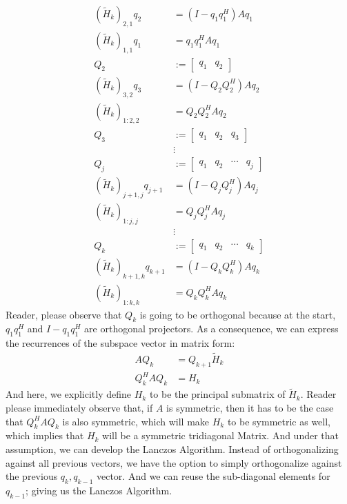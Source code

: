 \documentclass[]{article}
\theoremstyle{definition}
\begin{document}
            \begin{align}
                (\tilde{H}_k)_{2, 1}q_2 &= (I - q_1q_1^H)Aq_1
                \\
                (\tilde{H}_k)_{1, 1}q_1 &= q_1q_1^HAq_1
                \\
                Q_2 &:= \begin{bmatrix}
                    q_1 & q_2
                \end{bmatrix}
                \\
                (\tilde{H}_k)_{3, 2}q_3 &= (I - Q_2Q_2^H)Aq_2
                \\
                (\tilde{H}_k)_{1:2, 2} &= Q_2Q_2^HAq_2
                \\
                Q_3 &:= \begin{bmatrix}
                    q_1 & q_2 & q_3
                \end{bmatrix}
                \\
                & \vdots 
                \\
                Q_j &:= \begin{bmatrix}
                    q_1 & q_2 & \cdots & q_j
                \end{bmatrix}
                \\
                (\tilde{H}_k)_{j + 1, j}q_{j + 1}&= (I - Q_jQ_j^H)Aq_j
                \\
                (\tilde{H}_k)_{1:j, j} &= Q_jQ_j^HAq_j
                \\
                &\vdots 
                \\
                Q_k &:= \begin{bmatrix}
                    q_1 & q_2 & \cdots & q_k
                \end{bmatrix}
                \\
                (\tilde{H}_k)_{k + 1, k}q_{k + 1}&= (I - Q_kQ_k^H)Aq_k
                \\
                (\tilde{H}_k)_{1:k, k} &= Q_kQ_k^HAq_k
            \end{align}
            Reader, please observe that $Q_k$ is going to be orthogonal because at the start, $q_1q_1^H$ and $I - q_1q_1^H$ are orthogonal projectors. As a consequence, we can express the recurrences of the subspace vector in matrix form: 
            \begin{align}
                AQ_{k} &= Q_{k + 1}\tilde{H}_k
                \\
                Q_{k}^HAQ_{k} &= H_k
            \end{align}
            And here, we explicitly define $H_k$ to be the principal submatrix of $\tilde{H}_k$. Reader please immediately observe that, if $A$ is symmetric, then it has to be the case that $Q^H_kAQ_k$ is also symmetric, which will make $H_k$ to be symmetric as well, which implies that $H_k$ will be a symmetric tridiagonal Matrix. And under that assumption, we can develop the Lanczos Algorithm. Instead of orthogonalizing against all previous vectors, we have the option to simply orthogonalize against the previous $q_k, q_{k - 1}$ vector. And we can reuse the sub-diagonal elements for $q_{k - 1}$; giving us the Lanczos Algorithm. 
\end{document}

